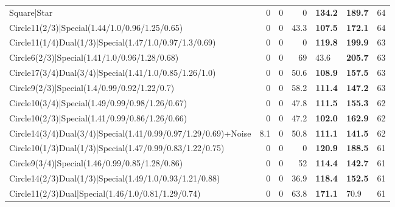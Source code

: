 \begin{tabular}{lrrrllr}
 Square|Star                                                    &          0   &            0   &           0   & \textbf{134.2} & \textbf{189.7} &           64 \\
 Circle11(2/3)|Special(1.44/1.0/0.96/1.25/0.65)                 &          0   &            0   &          43.3 & \textbf{107.5} & \textbf{172.1} &           64 \\
 Circle11(1/4)Dual(1/3)|Special(1.47/1.0/0.97/1.3/0.69)         &          0   &            0   &           0   & \textbf{119.8} & \textbf{199.9} &           63 \\
 Circle6(2/3)|Special(1.41/1.0/0.96/1.28/0.68)                  &          0   &            0   &          69   & 43.6           & \textbf{205.7} &           63 \\
 Circle17(3/4)Dual(3/4)|Special(1.41/1.0/0.85/1.26/1.0)         &          0   &            0   &          50.6 & \textbf{108.9} & \textbf{157.5} &           63 \\
 Circle9(2/3)|Special(1.4/0.99/0.92/1.22/0.7)                   &          0   &            0   &          58.2 & \textbf{111.4} & \textbf{147.2} &           63 \\
 Circle10(3/4)|Special(1.49/0.99/0.98/1.26/0.67)                &          0   &            0   &          47.8 & \textbf{111.5} & \textbf{155.3} &           62 \\
 Circle10(2/3)|Special(1.41/0.99/0.86/1.26/0.66)                &          0   &            0   &          47.2 & \textbf{102.0} & \textbf{162.9} &           62 \\
 Circle14(3/4)Dual(3/4)|Special(1.41/0.99/0.97/1.29/0.69)+Noise &          8.1 &            0   &          50.8 & \textbf{111.1} & \textbf{141.5} &           62 \\
 Circle10(1/3)Dual(1/3)|Special(1.47/0.99/0.83/1.22/0.75)       &          0   &            0   &           0   & \textbf{120.9} & \textbf{188.5} &           61 \\
 Circle9(3/4)|Special(1.46/0.99/0.85/1.28/0.86)                 &          0   &            0   &          52   & \textbf{114.4} & \textbf{142.7} &           61 \\
 Circle14(2/3)Dual(1/3)|Special(1.49/1.0/0.93/1.21/0.88)        &          0   &            0   &          36.9 & \textbf{118.4} & \textbf{152.5} &           61 \\
 Circle11(2/3)Dual|Special(1.46/1.0/0.81/1.29/0.74)             &          0   &            0   &          63.8 & \textbf{171.1} & 70.9           &           61 \\

\end{tabular}
